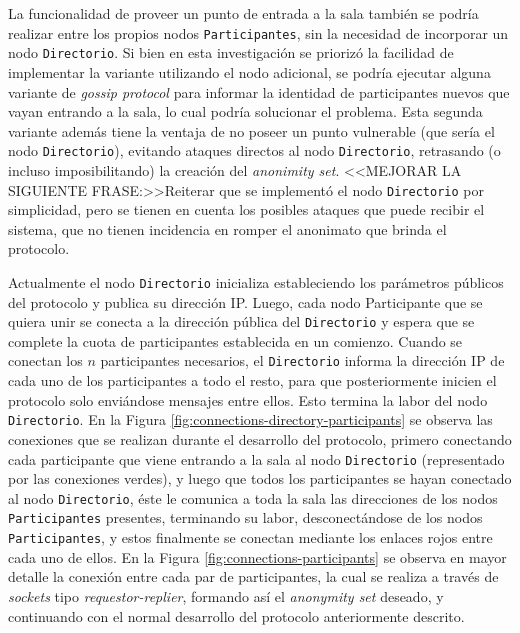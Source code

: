 {La funcionalidad de proveer un punto de entrada a la sala también se podría 
realizar entre los propios nodos \texttt{Participantes}, sin la necesidad de incorporar 
un nodo \texttt{Directorio}. Si bien en esta investigación se priorizó la 
facilidad de implementar la variante utilizando el nodo adicional, se podría 
ejecutar alguna variante de \emph{gossip protocol} 
\cite{Demers:1987:EAR:41840.41841} para informar la identidad de participantes 
nuevos que vayan entrando a la sala, lo cual podría solucionar el problema. 
Esta segunda variante además tiene la ventaja de no poseer un punto vulnerable 
(que sería el nodo \texttt{Directorio}), evitando ataques directos al nodo 
\texttt{Directorio}, retrasando (o incluso imposibilitando) la 
creación del \emph{anonimity set}. 
<<MEJORAR LA SIGUIENTE FRASE:>>Reiterar que se implementó el nodo 
\texttt{Directorio} por simplicidad, pero se tienen en cuenta los posibles 
ataques que puede recibir el sistema, que no tienen incidencia en romper el 
anonimato que brinda el protocolo.

Actualmente el nodo \texttt{Directorio} inicializa estableciendo los 
parámetros públicos del protocolo y publica su dirección IP. Luego, cada nodo 
Participante que se quiera unir se conecta a la dirección pública del 
\texttt{Directorio} y espera que se complete la cuota de participantes 
establecida en un comienzo. Cuando se conectan los $n$ participantes 
necesarios, el \texttt{Directorio} informa la dirección IP de cada uno de los 
participantes a todo el resto, para que posteriormente inicien el protocolo 
solo enviándose mensajes entre ellos. Esto termina la labor del nodo 
\texttt{Directorio}. En la Figura \ref{fig:connections-directory-participants} 
se observa las conexiones que se realizan durante el desarrollo del protocolo, 
primero conectando cada participante que viene entrando a la sala al nodo 
\texttt{Directorio} (representado por las conexiones verdes), y luego que 
todos los participantes se hayan conectado al nodo \texttt{Directorio}, éste 
le comunica a toda la sala las direcciones de los nodos \texttt{Participantes} 
presentes, terminando su labor, desconectándose de los nodos \texttt{Participantes}, y 
estos finalmente se conectan mediante los enlaces rojos entre cada uno de 
ellos. En la Figura \ref{fig:connections-participants} se observa en mayor 
detalle la conexión entre cada par de participantes, la cual se realiza a 
través de \emph{sockets} tipo \emph{requestor-replier}, formando así el 
\emph{anonymity set} deseado, y continuando con el normal desarrollo 
del protocolo anteriormente descrito.

}
